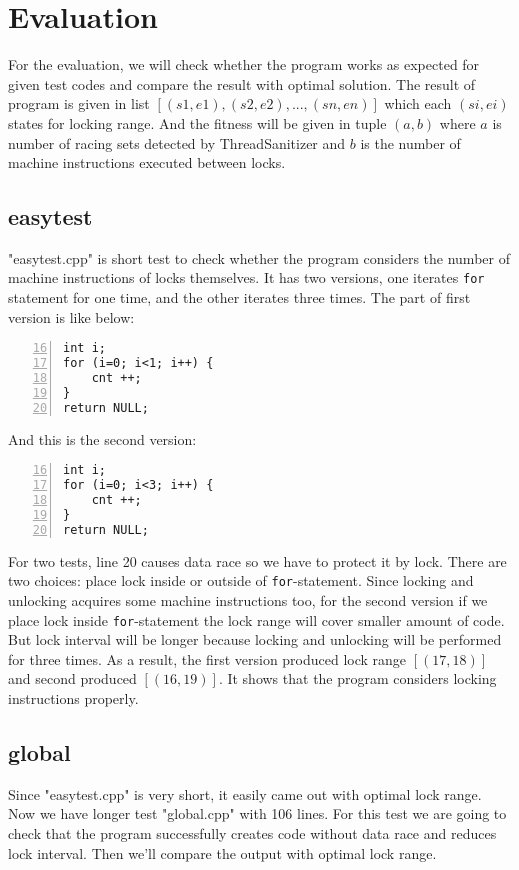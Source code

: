 \section{Evaluation}
\label{sec:eval}

For the evaluation, we will check whether the program works as expected for given test codes and compare the result with optimal solution. The result of program is given in list $[(s1, e1), (s2, e2), ..., (sn, en)]$ which each $(si, ei)$ states for locking range. And the fitness will be given in tuple $(a, b)$ where $a$ is number of racing sets detected by ThreadSanitizer and $b$ is the number of machine instructions executed between locks.

\subsection{easytest}
"easytest.cpp" is short test to check whether the program considers the number of machine instructions of locks themselves. It has two versions, one iterates \verb|for| statement for one time, and the other iterates three times. The part of first version is like below:

\begin{lstlisting}[frame=tb, xleftmargin=2em, framexleftmargin=1.5em, numbers=left, firstnumber=16]
int i;
for (i=0; i<1; i++) {
    cnt ++;
}
return NULL;
\end{lstlisting}

And this is the second version:

\begin{lstlisting}[frame=tb, xleftmargin=2em, framexleftmargin=1.5em, numbers=left, firstnumber=16]
int i;
for (i=0; i<3; i++) {
    cnt ++;
}
return NULL;
\end{lstlisting}

For two tests, line 20 causes data race so we have to protect it by lock. There are two choices: place lock inside or outside of \verb|for|-statement. Since locking and unlocking acquires some machine instructions too, for the second version if we place lock inside \verb|for|-statement the lock range will cover smaller amount of code. But lock interval will be longer because locking and unlocking will be performed for three times.
As a result, the first version produced lock range $[(17, 18)]$ and second produced $[(16, 19)]$. It shows that the program considers locking instructions properly.

\subsection{global}
Since "easytest.cpp" is very short, it easily came out with optimal lock range. Now we have longer test "global.cpp" with 106 lines. For this test we are going to check that the program successfully creates code without data race and reduces lock interval. Then we'll compare the output with optimal lock range.

